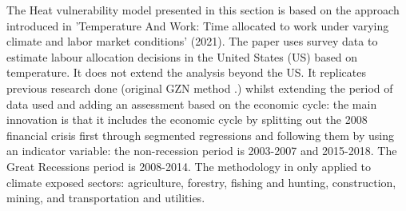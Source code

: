 \documentclass{article}
\begin{document}
The Heat vulnerability model presented in this section is based on the approach introduced in 'Temperature And Work: Time allocated to work under varying climate and labor market conditions' (2021)\cite{TemperatureAndWork:2021}. The paper uses survey data to estimate labour allocation decisions in the United States (US) based on temperature. It does not extend the analysis beyond the US. It replicates previous research done (original GZN method \cite{TemperatureAndTheAllocationofTime:2014}.) whilst extending the period of data used and adding an assessment based on the economic cycle: the main innovation is that it includes the economic cycle by splitting out the 2008 financial crisis first through segmented regressions and following them by using an indicator variable: the non-recession period is 2003-2007 and 2015-2018. The Great Recessions period is 2008-2014. The methodology in only applied to climate exposed sectors: agriculture, forestry, fishing and hunting, construction, mining, and transportation and utilities.


\end{document}
